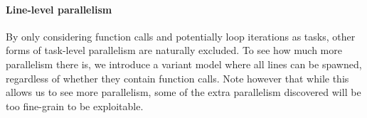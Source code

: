 \paragraph{Line-level parallelism}
By only considering function calls and potentially loop iterations as tasks, other forms of task-level parallelism are naturally excluded.
To see how much more parallelism there is, we introduce a variant model where all lines can be spawned, regardless of whether they contain function calls.
Note however that while this allows us to see more parallelism, some of the extra parallelism discovered will be too fine-grain to be exploitable.




































